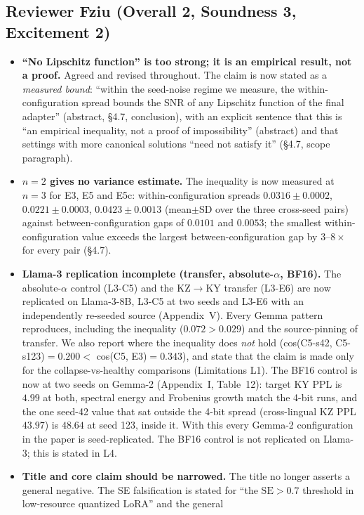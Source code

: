 \documentclass[11pt]{article}
\begin{document}
\subsection*{Reviewer Fziu (Overall 2, Soundness 3, Excitement 2)}
\begin{itemize}
\item \textbf{``No Lipschitz function'' is too strong; it is an empirical
result, not a proof.} Agreed and revised throughout. The claim is now stated
as a \emph{measured bound}: ``within the seed-noise regime we measure, the
within-configuration spread bounds the SNR of any Lipschitz function of the
final adapter'' (abstract, \S4.7, conclusion), with an explicit sentence
that this is ``an empirical inequality, not a proof of impossibility''
(abstract) and that settings with more canonical solutions ``need not
satisfy it'' (\S4.7, scope paragraph).
\item \textbf{$n{=}2$ gives no variance estimate.} The inequality is now
measured at $n{=}3$ for E3, E5 and E5c: within-configuration spreads
$0.0316\pm0.0002$, $0.0221\pm0.0003$, $0.0423\pm0.0013$ (mean$\pm$SD over the
three cross-seed pairs) against between-configuration gaps of $0.0101$ and
$0.0053$; the smallest within-configuration value exceeds the largest
between-configuration gap by $3$--$8\times$ for every pair (\S4.7).
\item \textbf{Llama-3 replication incomplete (transfer, absolute-$\alpha$,
BF16).} The absolute-$\alpha$ control (L3-C5) and the KZ$\to$KY transfer
(L3-E6) are now replicated on Llama-3-8B, L3-C5 at two seeds and L3-E6 with
an independently re-seeded source (Appendix~V). Every Gemma pattern
reproduces, including the inequality ($0.072>0.029$) and the source-pinning
of transfer. We also report where the inequality does \emph{not} hold
(cos(C5-s42, C5-s123)$=0.200 <$ cos(C5, E3)$=0.343$), and state that the
claim is made only for the collapse-vs-healthy comparisons (Limitations L1).
The BF16 control is now at two seeds on Gemma-2 (Appendix~I, Table~12):
target KY PPL is $4.99$ at both, spectral energy and Frobenius growth match
the 4-bit runs, and the one seed-42 value that sat outside the 4-bit spread
(cross-lingual KZ PPL $43.97$) is $48.64$ at seed 123, inside it. With this
every Gemma-2 configuration in the paper is seed-replicated. The BF16
control is not replicated on Llama-3; this is stated in L4.
\item \textbf{Title and core claim should be narrowed.} The title no longer
asserts a general negative. The SE falsification is stated for ``the
$\mathrm{SE}>0.7$ threshold in low-resource quantized LoRA'' and the general

\end{itemize}
\end{document}
